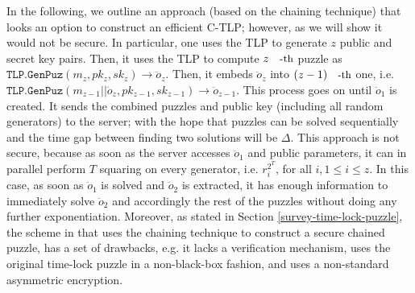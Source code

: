 \begin{remark}\label{remark::trivial-chaining}
In the following, we outline an approach (based on the chaining technique) that looks an option to construct an efficient C-TLP; however, as we will show it would not be secure. In particular,  one uses the TLP to generate $z$ public and secret key pairs. Then, it uses the TLP to compute $z\text{\small{-th}}$ puzzle as $\mathtt{TLP.GenPuz}(m_{\scriptscriptstyle z},pk_{\scriptscriptstyle z},sk_{\scriptscriptstyle z})\rightarrow \ddot{o}_{\scriptscriptstyle z}$.  Then, it embeds $\ddot{o}_{\scriptscriptstyle z}$ into $(z-1)\text{\small{-th}}$ one, i.e. $\mathtt{TLP.GenPuz}(m_{\scriptscriptstyle z-1}||\ddot{o}_{\scriptscriptstyle z},pk_{\scriptscriptstyle z-1},sk_{\scriptscriptstyle z-1})\rightarrow \ddot{o}_{\scriptscriptstyle z-1}$. This process goes on until $\ddot{o}_{\scriptscriptstyle 1}$  is created. It sends the combined puzzles and public key (including all random generators) to the server; with the hope that puzzles can be solved sequentially and the time gap between finding two solutions will be $\Delta$.  This approach is not secure, because as soon as the server accesses $\ddot{o}_{\scriptscriptstyle 1}$ and public parameters, it can in parallel perform $T$ squaring on every generator, i.e. $r^{\scriptscriptstyle 2^{\scriptscriptstyle T}}_{\scriptscriptstyle i}$, for all $i, 1\leq i\leq z$. In this case, as soon as $\ddot{o}_{\scriptscriptstyle 1}$ is solved and  $\ddot{o}_{\scriptscriptstyle 2}$  is extracted, it has enough information to  immediately solve $\ddot{o}_{\scriptscriptstyle 2}$ and accordingly the rest of the puzzles without doing any further exponentiation. Moreover, as stated in Section \ref{survey-time-lock-puzzle}, the scheme in \cite{ChvojkaJSS20} that uses the chaining technique to construct  a secure chained puzzle, has a set of drawbacks, e.g. it lacks a verification mechanism, uses the original time-lock puzzle in a non-black-box fashion, and uses a non-standard asymmetric encryption. 
\end{remark}
